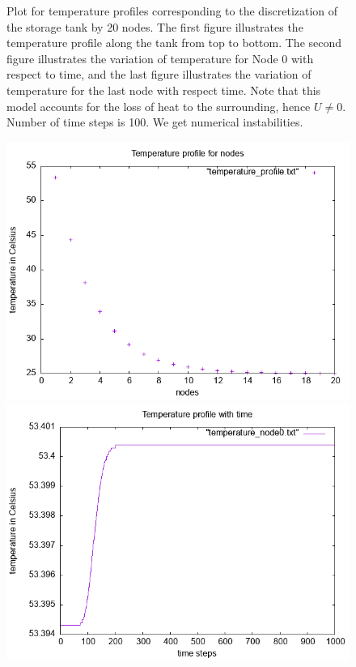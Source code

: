 \documentclass{article}
\begin{document}
\begin{figure}[ht]
\caption{Plot for temperature profiles corresponding to the discretization of the storage tank by 20 nodes. The first figure illustrates the temperature profile along the tank from top to bottom. The second figure illustrates the variation of temperature for Node 0 with respect to time, and the last figure illustrates the variation of temperature for the last node with respect time. Note that this model accounts for the loss of heat to the surrounding, hence $U \neq 0$. Number of time steps is 100. We get numerical instabilities.}
\end{figure}

\begin{figure}[ht]
\centering
\includegraphics[scale = 0.5]{figures/temperature_profile_N_20.png}
\includegraphics[scale =0.5]{figures/temperature_node0_N_20.png}

\end{figure}
\end{document}
